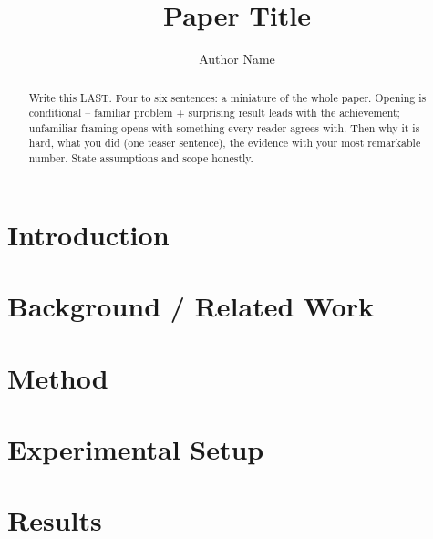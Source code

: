 \documentclass{article}
\title{Paper Title}
\author{Author Name}
\begin{document}
\maketitle

\begin{abstract}
Write this LAST. Four to six sentences: a miniature of the whole paper.
Opening is conditional -- familiar problem + surprising result leads with the
achievement; unfamiliar framing opens with something every reader agrees with.
Then why it is hard, what you did (one teaser sentence), the evidence with
your most remarkable number. State assumptions and scope honestly.
\end{abstract}

\section{Introduction}

\section{Background / Related Work}

\section{Method}

\section{Experimental Setup}

\section{Results}
\end{document}

